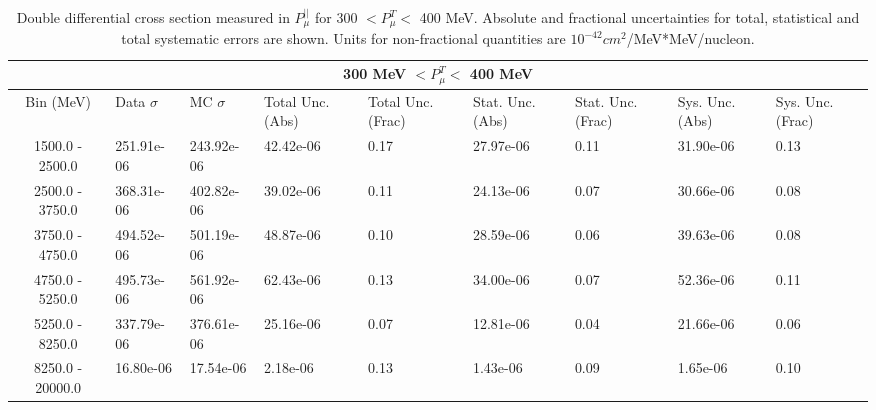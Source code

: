 \begin{table}[!htb]
    \centering
    \tiny
    \begin{tabular}{|c|p{0.5in}|p{0.5in}|p{0.5in}|p{0.5in}|p{0.5in}|p{0.5in}|p{0.5in}|p{0.5in}|}

        \hline
        \multicolumn{9}{c}{300 MeV $ < P^T_\mu < $ 400 MeV}\\
        \hline
        Bin (MeV)& Data $\sigma$ & MC $\sigma$ & Total Unc. (Abs) & Total Unc. (Frac)  & Stat. Unc. (Abs) & Stat. Unc. (Frac) & Sys. Unc. (Abs) & Sys. Unc. (Frac)\\ \hline
1500.0 - 2500.0 & 251.91e-06 & 243.92e-06 & 42.42e-06 & 0.17 & 27.97e-06 & 0.11 & 31.90e-06 & 0.13\\ \hline
2500.0 - 3750.0 & 368.31e-06 & 402.82e-06 & 39.02e-06 & 0.11 & 24.13e-06 & 0.07 & 30.66e-06 & 0.08\\ \hline
3750.0 - 4750.0 & 494.52e-06 & 501.19e-06 & 48.87e-06 & 0.10 & 28.59e-06 & 0.06 & 39.63e-06 & 0.08\\ \hline
4750.0 - 5250.0 & 495.73e-06 & 561.92e-06 & 62.43e-06 & 0.13 & 34.00e-06 & 0.07 & 52.36e-06 & 0.11\\ \hline
5250.0 - 8250.0 & 337.79e-06 & 376.61e-06 & 25.16e-06 & 0.07 & 12.81e-06 & 0.04 & 21.66e-06 & 0.06\\ \hline
8250.0 - 20000.0 & 16.80e-06 & 17.54e-06 & 2.18e-06 & 0.13 & 1.43e-06 & 0.09 & 1.65e-06 & 0.10\\ \hline



    \end{tabular}
    \caption{Double differential cross section measured in $P^{||}_\mu$ for 300 $ < P^T_\mu < $ 400 MeV. Absolute and fractional uncertainties for total, statistical and total systematic errors are shown. Units for non-fractional quantities are $10^{-42}cm^2$/MeV*MeV/nucleon.}
    \label{tab:ApdxA:XSecTable2Dpzmuptmu3}
\end{table}

